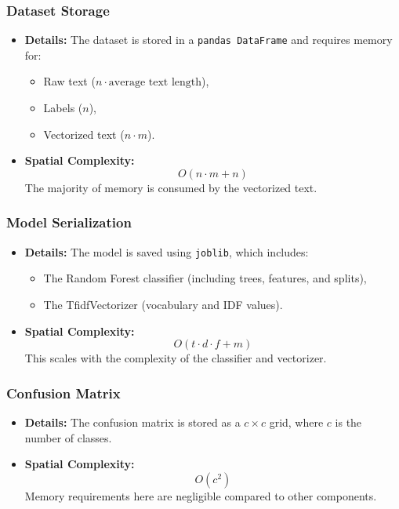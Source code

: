 \documentclass[runningheads,a4paper,11pt]{report}
\begin{document}
\subsubsection{Dataset Storage}
\label{section:data-storage}
\begin{itemize}
  \item \textbf{Details:} The dataset is stored in a \texttt{pandas DataFrame} and requires memory for:
  \begin{itemize}
    \item Raw text ($n \cdot \text{average text length}$),
    \item Labels ($n$),
    \item Vectorized text ($n \cdot m$).
  \end{itemize}
  \item \textbf{Spatial Complexity:}
  \[
  O(n \cdot m + n)
  \]
  The majority of memory is consumed by the vectorized text.
\end{itemize}

\subsubsection{Model Serialization}
\label{section:model}
\begin{itemize}
  \item \textbf{Details:} The model is saved using \texttt{joblib}, which includes:
  \begin{itemize}
    \item The Random Forest classifier (including trees, features, and splits),
    \item The TfidfVectorizer (vocabulary and IDF values).
  \end{itemize}
  \item \textbf{Spatial Complexity:}
  \[
  O(t \cdot d \cdot f + m)
  \]
  This scales with the complexity of the classifier and vectorizer.
\end{itemize}

\subsubsection{Confusion Matrix}
\label{section:confusion}
\begin{itemize}
  \item \textbf{Details:} The confusion matrix is stored as a $c \times c$ grid, where $c$ is the number of classes.
  \item \textbf{Spatial Complexity:}
  \[
  O(c^2)
  \]
  Memory requirements here are negligible compared to other components.
\end{itemize}
\end{document}
